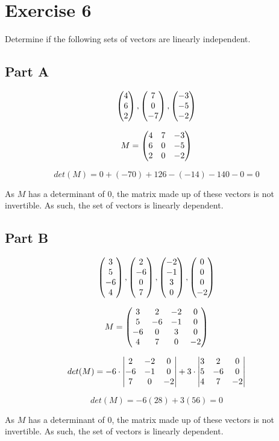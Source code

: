 \section*{Exercise 6}

Determine if the following sets of vectors are linearly independent. 

\subsection*{Part A}

\[
	\genpmat{4\\6\\2}, \genpmat{7\\0\\-7}, \genpmat{-3\\-5\\-2}
\]

\[
	M = \genpmat{
		4&7&-3\\
		6&0&-5\\
		2&0&-2
	}
\]

\[
	det(M) = 0 + (-70) + 126 - (-14) - 140 - 0 = 0
\]

As $M$ has a determinant of 0, the matrix made up of these vectors is not invertible. As such, the set of vectors is linearly dependent. 

\subsection*{Part B}

\[
	\genpmat{3\\5\\-6\\4}, \genpmat{2\\-6\\0\\7},
	\genpmat{-2\\-1\\3\\0}, \genpmat{0\\0\\0\\-2}
\]

\[
M = \genpmat{
	3&2&-2&0\\
	5&-6&-1&0\\
	-6&0&3&0\\
	4&7&0&-2
}
\]

\[
	det(M) = 
	-6 \cdot \genericmat{v}{
		2&-2&0\\
		-6&-1&0\\
		7&0&-2
	} +
	3 \cdot \genericmat{v}{
		3&2&0\\
		5&-6&0\\
		4&7&-2
	}
\]

\[
det(M) = -6(28) + 3(56) = 0
\]

As $M$ has a determinant of 0, the matrix made up of these vectors is not invertible. As such, the set of vectors is linearly dependent. 


